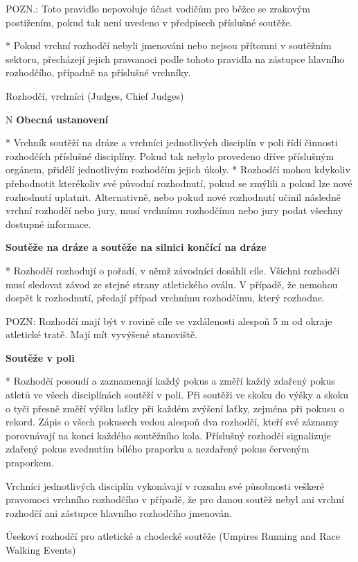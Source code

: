 POZN.: Toto pravidlo nepovoluje účast vodičům pro běžce se zrakovým postižením, pokud tak není uvedeno v předpisech příslušné soutěže.

* Pokud vrchní rozhodčí nebyli jmenováni nebo nejsou přítomni v soutěžním sektoru, přecházejí jejich pravomoci podle tohoto pravidla na zástupce hlavního rozhodčího, případně na příslušné vrchníky.
\enditems

\secc Rozhodčí, vrchníci (Judges, Chief Judges)

\begitems \style N
{\bf Obecná ustanovení}

* Vrchník soutěží na dráze a vrchníci jednotlivých disciplín v poli řídí činnosti rozhodčích příslušné disciplíny. Pokud tak nebylo provedeno dříve příslušným orgánem, přidělí jednotlivým rozhodčím jejich úkoly.
* Rozhodčí mohou kdykoliv přehodnotit kterékoliv své původní rozhodnutí, pokud se zmýlili a pokud lze nové rozhodnutí uplatnit. Alternativně, nebo pokud nové rozhodnutí učinil následně vrchní rozhodčí nebo jury, musí vrchnímu rozhodčímu nebo jury podat všechny dostupné informace.

{\bf Soutěže na dráze a soutěže na silnici končící na dráze}

* Rozhodčí rozhodují o pořadí, v němž závodníci dosáhli cíle. Všichni rozhodčí musí sledovat závod ze stejné strany atletického oválu. V případě, že nemohou dospět k rozhodnutí, předají případ vrchnímu rozhodčímu, který rozhodne.

POZN:  Rozhodčí mají být v rovině cíle ve vzdálenosti alespoň 5 m od okraje atletické tratě. Mají mít vyvýšené stanoviště.

{\bf Soutěže v poli}

* Rozhodčí posoudí a zaznamenají každý pokus a změří každý zdařený pokus atletů ve všech disciplínách soutěží v poli. Při soutěži ve skoku do výšky a skoku o tyči přesně změří výšku laťky při každém zvýšení laťky, zejména při pokusu o rekord. Zápis o všech pokusech vedou alespoň dva rozhodčí, kteří své záznamy porovnávají na konci každého soutěžního kola. Příslušný rozhodčí signalizuje zdařený pokus zvednutím bílého praporku a nezdařený pokus červeným praporkem.

Vrchníci jednotlivých disciplín vykonávají v rozsahu své působnosti veškeré pravomoci vrchního rozhodčího v případě, že pro danou soutěž nebyl ani vrchní rozhodčí ani zástupce hlavního rozhodčího jmenován.
\enditems

\secc Úsekoví rozhodčí pro atletické a chodecké soutěže (Umpires Running and Race Walking Events)

